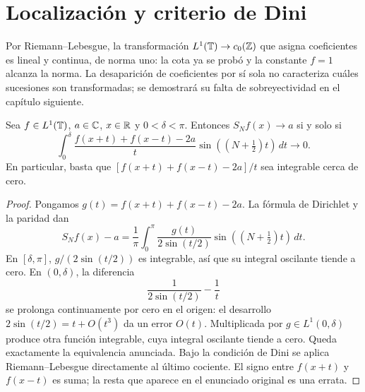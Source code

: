 \section{Localización y criterio de Dini}\label{lectura:v4-07}
Por Riemann--Lebesgue, la transformación $L^1(\mathbb T)\to c_0(\mathbb Z)$ que asigna coeficientes es lineal y continua, de norma uno: la cota ya se probó y la constante $f=1$ alcanza la norma. La desaparición de coeficientes por sí sola no caracteriza cuáles sucesiones son transformadas; se demostrará su falta de sobreyectividad en el capítulo siguiente.
\begin{teorema}\label{v4:dini}
Sea $f\in L^1(\mathbb T)$, $a\in\mathbb C$, $x\in\mathbb R$ y $0<\delta<\pi$. Entonces $S_Nf(x)\to a$ si y solo si
\[
 \int_0^\delta\frac{f(x+t)+f(x-t)-2a}{t}\sin((N+\tfrac12)t)\,dt\longrightarrow0.
\]
En particular, basta que $[f(x+t)+f(x-t)-2a]/t$ sea integrable cerca de cero.
\end{teorema}
\begin{proof}
Pongamos $g(t)=f(x+t)+f(x-t)-2a$. La fórmula de Dirichlet y la paridad dan
\[
 S_Nf(x)-a=\frac1\pi\int_0^\pi\frac{g(t)}{2\sin(t/2)}\sin((N+\tfrac12)t)\,dt.
\]
En $[\delta,\pi]$, $g/(2\sin(t/2))$ es integrable, así que su integral oscilante tiende a cero. En $(0,\delta)$, la diferencia
\[
 \frac1{2\sin(t/2)}-\frac1t
\]
se prolonga continuamente por cero en el origen: el desarrollo $2\sin(t/2)=t+O(t^3)$ da un error $O(t)$. Multiplicada por $g\in L^1(0,\delta)$ produce otra función integrable, cuya integral oscilante tiende a cero. Queda exactamente la equivalencia anunciada. Bajo la condición de Dini se aplica Riemann--Lebesgue directamente al último cociente. El signo entre $f(x+t)$ y $f(x-t)$ es suma; la resta que aparece en el enunciado original es una errata.
\end{proof}

